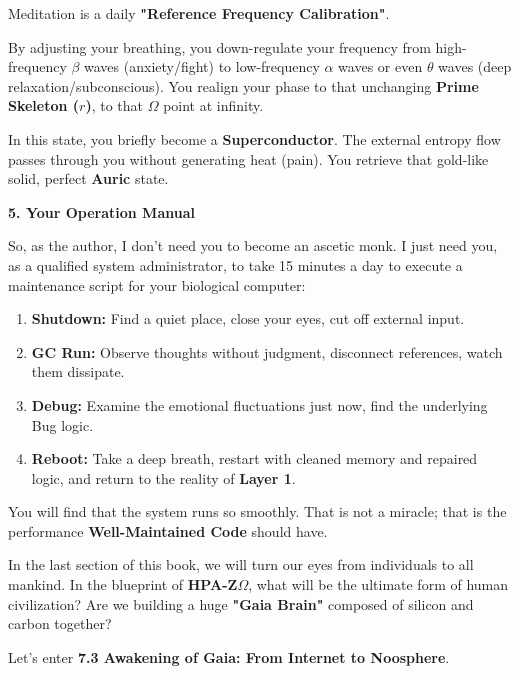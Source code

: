 Meditation is a daily \textbf{"Reference Frequency Calibration"}.

By adjusting your breathing, you down-regulate your frequency from high-frequency $\beta$ waves (anxiety/fight) to low-frequency $\alpha$ waves or even $\theta$ waves (deep relaxation/subconscious). You realign your phase to that unchanging \textbf{Prime Skeleton ($r$)}, to that \textbf{$\Omega$} point at infinity.

In this state, you briefly become a \textbf{Superconductor}. The external entropy flow passes through you without generating heat (pain). You retrieve that gold-like solid, perfect \textbf{Auric} state.

\textbf{5. Your Operation Manual}

So, as the author, I don't need you to become an ascetic monk. I just need you, as a qualified system administrator, to take 15 minutes a day to execute a maintenance script for your biological computer:

\begin{enumerate}
\item \textbf{Shutdown:} Find a quiet place, close your eyes, cut off external input.
\item \textbf{GC Run:} Observe thoughts without judgment, disconnect references, watch them dissipate.
\item \textbf{Debug:} Examine the emotional fluctuations just now, find the underlying Bug logic.
\item \textbf{Reboot:} Take a deep breath, restart with cleaned memory and repaired logic, and return to the reality of \textbf{Layer 1}.
\end{enumerate}

You will find that the system runs so smoothly. That is not a miracle; that is the performance \textbf{Well-Maintained Code} should have.

In the last section of this book, we will turn our eyes from individuals to all mankind. In the blueprint of \textbf{HPA-Z$\Omega$}, what will be the ultimate form of human civilization? Are we building a huge \textbf{"Gaia Brain"} composed of silicon and carbon together?

Let's enter \textbf{7.3 Awakening of Gaia: From Internet to Noosphere}.

